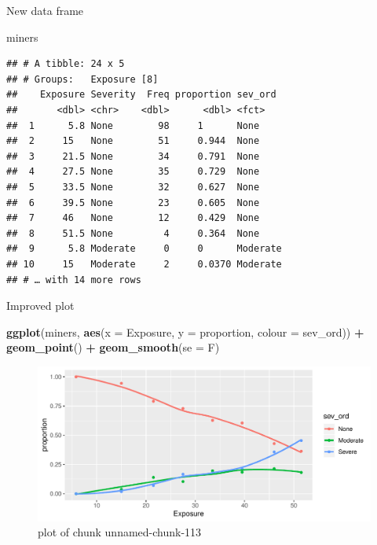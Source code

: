 \documentclass[ignorenonframetext,]{beamer}
\newenvironment{Shaded}{\begin{snugshade}}{\end{snugshade}}
\newcommand{\DataTypeTok}[1]{\textcolor[rgb]{0.13,0.29,0.53}{#1}}
\newcommand{\KeywordTok}[1]{\textcolor[rgb]{0.13,0.29,0.53}{\textbf{#1}}}
\newcommand{\NormalTok}[1]{#1}
\newcommand{\OperatorTok}[1]{\textcolor[rgb]{0.81,0.36,0.00}{\textbf{#1}}}
\newcommand{\StringTok}[1]{\textcolor[rgb]{0.31,0.60,0.02}{#1}}
\begin{document}
\begin{frame}[fragile]{New data frame}
\protect\hypertarget{new-data-frame}{}

\small

\begin{Shaded}
\begin{Highlighting}[]
\NormalTok{miners}
\end{Highlighting}
\end{Shaded}

\begin{verbatim}
## # A tibble: 24 x 5
## # Groups:   Exposure [8]
##    Exposure Severity  Freq proportion sev_ord 
##       <dbl> <chr>    <dbl>      <dbl> <fct>   
##  1      5.8 None        98     1      None    
##  2     15   None        51     0.944  None    
##  3     21.5 None        34     0.791  None    
##  4     27.5 None        35     0.729  None    
##  5     33.5 None        32     0.627  None    
##  6     39.5 None        23     0.605  None    
##  7     46   None        12     0.429  None    
##  8     51.5 None         4     0.364  None    
##  9      5.8 Moderate     0     0      Moderate
## 10     15   Moderate     2     0.0370 Moderate
## # … with 14 more rows
\end{verbatim}

\normalsize

\end{frame}

\begin{frame}[fragile]{Improved plot}
\protect\hypertarget{improved-plot}{}

\begin{Shaded}
\begin{Highlighting}[]
\KeywordTok{ggplot}\NormalTok{(miners, }\KeywordTok{aes}\NormalTok{(}\DataTypeTok{x =}\NormalTok{ Exposure, }\DataTypeTok{y =}\NormalTok{ proportion,}
                   \DataTypeTok{colour =}\NormalTok{ sev_ord)) }\OperatorTok{+}\StringTok{ }
\StringTok{  }\KeywordTok{geom_point}\NormalTok{() }\OperatorTok{+}\StringTok{ }\KeywordTok{geom_smooth}\NormalTok{(}\DataTypeTok{se =}\NormalTok{ F)}
\end{Highlighting}
\end{Shaded}

\begin{figure}
\centering
\includegraphics{figure/unnamed-chunk-113-1.pdf}
\caption{plot of chunk unnamed-chunk-113}
\end{figure}

\end{frame}
\end{document}
